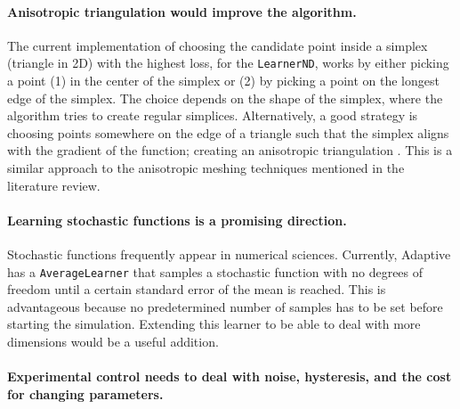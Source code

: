 \hypertarget{anisotropic-triangulation-would-improve-the-algorithm.}{%
\paragraph{Anisotropic triangulation would improve the algorithm.}\label{anisotropic-triangulation-would-improve-the-algorithm.}}

The current implementation of choosing the candidate point inside a simplex (triangle in 2D) with the highest loss, for the \passthrough{\lstinline!LearnerND!}, works by either picking a point (1) in the center of the simplex or (2) by picking a point on the longest edge of the simplex.
The choice depends on the shape of the simplex, where the algorithm tries to create regular simplices.
Alternatively, a good strategy is choosing points somewhere on the edge of a triangle such that the simplex aligns with the gradient of the function; creating an anisotropic triangulation \cite{Dyn1990}.
This is a similar approach to the anisotropic meshing techniques mentioned in the literature review.

\hypertarget{learning-stochastic-functions-is-a-promising-direction.}{%
\paragraph{Learning stochastic functions is a promising direction.}\label{learning-stochastic-functions-is-a-promising-direction.}}

Stochastic functions frequently appear in numerical sciences.
Currently, Adaptive has a \passthrough{\lstinline!AverageLearner!} that samples a stochastic function with no degrees of freedom until a certain standard error of the mean is reached.
This is advantageous because no predetermined number of samples has to be set before starting the simulation.
Extending this learner to be able to deal with more dimensions would be a useful addition.

\hypertarget{experimental-control-needs-to-deal-with-noise-hysteresis-and-the-cost-for-changing-parameters.}{%
\paragraph{Experimental control needs to deal with noise, hysteresis, and the cost for changing parameters.}\label{experimental-control-needs-to-deal-with-noise-hysteresis-and-the-cost-for-changing-parameters.}}

